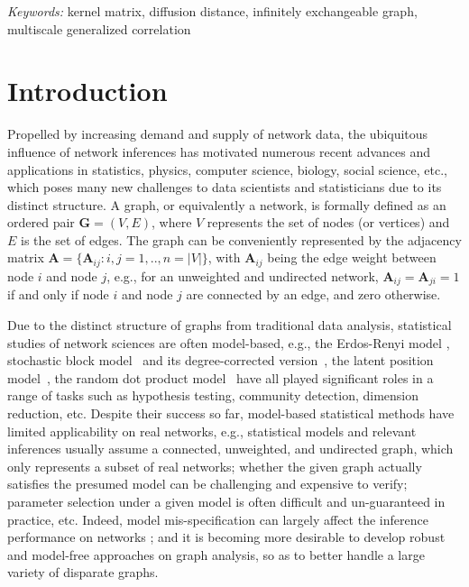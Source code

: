 \documentclass[12pt]{article}
\theoremstyle{definition}
\begin{document}
	\noindent%
	{\it Keywords:} kernel matrix, diffusion distance, infinitely exchangeable graph, multiscale generalized correlation
	
	\sloppy
	
	\newpage
	\section{Introduction}
	\label{sec:intro}
	
	Propelled by increasing demand and supply of network data, the ubiquitous influence of network inferences has motivated numerous recent advances and applications in statistics, physics, computer science, biology, social science, etc., which poses many new challenges to data scientists and statisticians due to its distinct structure. A graph, or equivalently a network, is formally defined as an ordered pair $\mathbf{G}=(V,E)$, where $V$ represents the set of nodes (or vertices) and $E$ is the set of edges. The graph can be conveniently represented by the adjacency matrix $\mathbf{A} = \{\mathbf{A}_{ij} : i,j= 1,..,n = |V| \}$, with $\mathbf{A}_{ij}$ being the edge weight between node $i$ and node $j$, e.g., for an unweighted and undirected network, $\mathbf{A}_{ij} =\mathbf{A}_{ji} = 1$ if and only if node $i$ and node $j$ are connected by an edge, and zero otherwise.
	
	Due to the distinct structure of graphs from traditional data analysis, statistical studies of network sciences are often model-based, e.g., the Erdos-Renyi model \citep{erdosrenyi1959,Gilbert1959}, stochastic block model~\citep{HollandEtAl1983, rohe2011spectral,SussmanEtAl2012,Lei2015} and its degree-corrected version~\citep{karrer2011stochastic, ZhaoLevinaZhu2012}, the latent position model~\citep{TangSussmanPriebe2013,fosdick2015testing}, the random dot product model~\citep{YoungScheinerman2007, sussman2014consistent} have all played significant roles in a range of tasks such as hypothesis testing, community detection, dimension reduction, etc. Despite their success so far, model-based statistical methods have limited applicability on real networks, e.g., statistical models and relevant inferences usually assume a connected, unweighted, and undirected graph, which only represents a subset of real networks; whether the given graph actually satisfies the presumed model can be challenging and expensive to verify; parameter selection under a given model is often difficult and un-guaranteed in practice, etc. Indeed, model mis-specification can largely affect the inference performance on networks \citep{ChenShenVogelsteinPriebe2016}; and it is becoming more desirable to develop robust and model-free approaches on graph analysis, so as to better handle a large variety of disparate graphs. 
	
\end{document}
